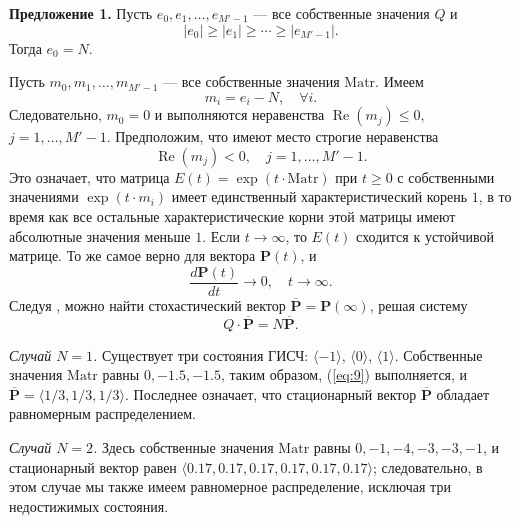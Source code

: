 \documentclass[a4paper,12pt]{article}
\begin{document}
\textbf{Предложение 1.} Пусть $e_0, e_1, \ldots, e_{M'-1}$ --- все собственные значения $Q$ и
\begin{equation}
|e_0| \geq |e_1| \geq \cdots \geq |e_{M'-1}|.
\label{eq:7}
\end{equation}
Тогда $e_0 = N$.

Пусть $m_0, m_1, \ldots, m_{M'-1}$ --- все собственные значения $\mathrm{Matr}$. Имеем
\begin{equation}
m_i = e_i - N,\quad \forall i.
\label{eq:8}
\end{equation}
Следовательно, $m_0 = 0$ и выполняются неравенства $\operatorname{Re}(m_j) \leq 0$, $j = 1,\ldots,M'-1$. Предположим, что имеют место строгие неравенства
\begin{equation}
\operatorname{Re}(m_j) < 0,\quad j = 1,\ldots,M'-1.
\label{eq:9}
\end{equation}
Это означает, что матрица $E(t) = \exp(t\cdot \mathrm{Matr})$ при $t\ge 0$ с собственными значениями $\exp(t\cdot m_i)$ имеет единственный характеристический корень $1$, в то время как все остальные характеристические корни этой матрицы имеют абсолютные значения меньше $1$. Если $t\to\infty$, то $E(t)$ сходится к устойчивой матрице. То же самое верно для вектора $\mathbf{P}(t)$, и
\begin{equation}
\frac{d\mathbf{P}(t)}{dt} \to 0,\quad t\to\infty.
\label{eq:10}
\end{equation}
Следуя \cite{kleinrock1980}, можно найти стохастический вектор $\overline{\mathbf{P}} = \mathbf{P}(\infty)$, решая систему
\begin{equation}
Q\cdot \overline{\mathbf{P}} = N\overline{\mathbf{P}}.
\label{eq:11}
\end{equation}

\textit{Случай $N=1$.} Существует три состояния ГИСЧ: $\langle -1\rangle$, $\langle 0\rangle$, $\langle 1\rangle$. Собственные значения $\mathrm{Matr}$ равны $0, -1.5, -1.5$, таким образом, (\ref{eq:9}) выполняется, и $\overline{\mathbf{P}} = \langle 1/3, 1/3, 1/3\rangle$. Последнее означает, что стационарный вектор $\overline{\mathbf{P}}$ обладает равномерным распределением.

\textit{Случай $N=2$.} Здесь собственные значения $\mathrm{Matr}$ равны $0, -1, -4, -3, -3, -1$, и стационарный вектор равен $\langle 0.17, 0.17, 0.17, 0.17, 0.17, 0.17\rangle$; следовательно, в этом случае мы также имеем равномерное распределение, исключая три недостижимых состояния.
\end{document}
